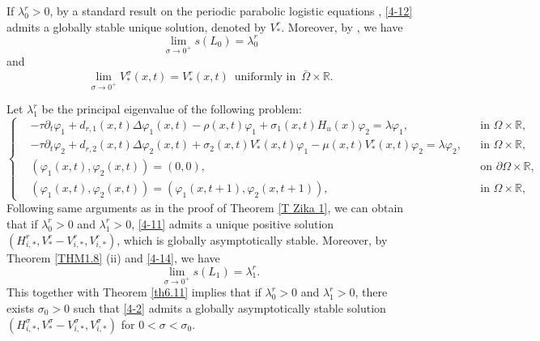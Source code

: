 \documentclass[11pt,reqno]{amsart}
\numberwithin{equation}{section}
\begin{document}
If $\lambda_{0}^{r}>0$,
by a standard result on the periodic parabolic logistic equations \cite[Theorem 3.1.5]{Zhao}, \eqref{4-12} admits a globally stable unique solution, denoted by $V^{r}_{*}$.
Moreover, by \cite[Theorems B and C]{SX}, we have
\begin{equation}\label{lambdar}
\lim_{\sigma\to 0^{+}} s(L_{0}) = \lambda_{0}^{r}
\end{equation}
and
\begin{equation}\label{4-14}
\lim_{\sigma\to 0^{+}} V_{*}^{\sigma}(x,t) = V^{r}_{*}(x,t) \enspace \text{uniformly in}\enspace \bar{\Omega}\times\mathbb{R}.
\end{equation}





Let $\lambda_{1}^{r}$ be the principal eigenvalue of the following problem:
\begin{equation}\label{4-15}
\left\{
\begin{aligned}
& -\tau \partial_{t} \varphi_{1} + d_{r,1}(x,t)\Delta \varphi_{1}(x,t)-\rho(x,t)\varphi_{1}+\sigma_{1}(x,t)H_{u}(x)\varphi_{2} = \lambda \varphi_{1},&& \text{in } \Omega\times\mathbb{R},
\\
&- \tau \partial_{t} \varphi_{2} +d_{r,2}(x,t)\Delta \varphi_{2}(x,t)+\sigma_{2}(x,t)V^{r}_{*}(x,t)\varphi_{1}-\mu(x,t)V^{r}_{*}(x,t)\varphi_{2} = \lambda \varphi_{2},&& \text{in } \Omega\times\mathbb{R},
\\
&( \varphi_{1}(x,t), \varphi_{2}(x,t)) = ( 0, 0),&& \text{on } \partial\Omega\times\mathbb{R},
\\
&( \varphi_{1}(x,t), \varphi_{2}(x,t)) = ( \varphi_{1}(x,t+1), \varphi_{2}(x,t+1)),&& \text{in } \Omega\times\mathbb{R},
\end{aligned}
\right.
\end{equation}
Following same arguments as in the proof of Theorem \ref{T Zika 1}, we can obtain that if $\lambda_{0}^{r}>0$ and $\lambda_{1}^{r}>0$, \eqref{4-11} admits a unique positive solution $({H}_{i,*}^{r},V^{r}_{*}-{V}^{r}_{i,*},{V}^{r}_{i,*})$, which is globally asymptotically stable. Moreover,
by Theorem \ref{THM1.8} (ii) and \eqref{4-14}, we have
\begin{equation*}
\lim_{\sigma \to 0^{+}} s(L_{1}) = \lambda_{1}^{r}.
\end{equation*}
This together with Theorem \ref{th6.11} implies that if $\lambda_{0}^{r}>0$ and $\lambda_{1}^{r}>0$, there exists $\sigma_{0}>0$ such that \eqref{4-2} admits a globally asymptotically stable solution $(H_{i,*}^{\sigma},V_{*}^{\sigma}-V_{i,*}^{\sigma},V_{i,*}^{\sigma})$ for $0<\sigma<\sigma_{0}$.
\end{document}
